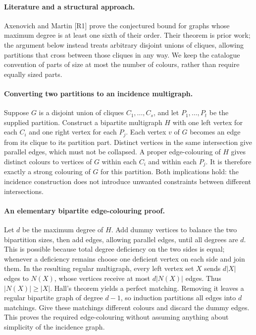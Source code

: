 \documentclass[11pt,a4paper]{article}
\begin{document}
\paragraph{Literature and a structural approach.}
Axenovich and Martin [R1] prove the conjectured bound for graphs whose
maximum degree is at least one sixth of their order. Their theorem is
prior work; the argument below instead treats arbitrary disjoint unions
of cliques, allowing partitions that cross between those cliques in any
way. We keep the catalogue convention of parts of size at most the
number of colours, rather than require equally sized parts.

\paragraph{Converting two partitions to an incidence multigraph.}
Suppose $G$ is a disjoint union of cliques $C_1,\ldots,C_s$, and let
$P_1,\ldots,P_t$ be the supplied partition. Construct a bipartite
multigraph $H$ with one left vertex for each $C_i$ and one right vertex
for each $P_j$. Each vertex $v$ of $G$ becomes an edge from its clique
to its partition part. Distinct vertices in the same intersection give
parallel edges, which must not be collapsed. A proper edge-colouring of
$H$ gives distinct colours to vertices of $G$ within each $C_i$ and
within each $P_j$. It is therefore exactly a strong colouring of $G$
for this partition. Both implications hold: the incidence construction
does not introduce unwanted constraints between different intersections.

\paragraph{An elementary bipartite edge-colouring proof.}
Let $d$ be the maximum degree of $H$. Add dummy vertices to balance the
two bipartition sizes, then add edges, allowing parallel edges, until
all degrees are $d$. This is possible because total degree deficiency
on the two sides is equal; whenever a deficiency remains choose one
deficient vertex on each side and join them. In the resulting regular
multigraph, every left vertex set $X$ sends $d|X|$ edges to $N(X)$,
whose vertices receive at most $d|N(X)|$ edges. Thus $|N(X)|\ge|X|$.
Hall's theorem yields a perfect matching. Removing it leaves a regular
bipartite graph of degree $d-1$, so induction partitions all edges into
$d$ matchings. Give these matchings different colours and discard the
dummy edges. This proves the required edge-colouring without assuming
anything about simplicity of the incidence graph.
\end{document}
